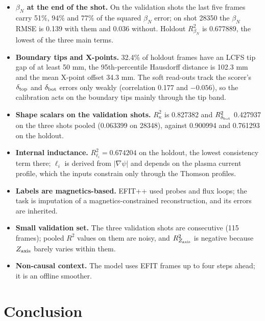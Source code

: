 \documentclass[11pt,a4paper]{article}
\numberwithin{equation}{section}
\begin{document}
\begin{itemize}
\item
  \textbf{\(\beta_N\) at the end of the shot.} On the validation shots the last five frames carry 51\%, 94\% and 77\% of the squared \(\beta_N\) error; on shot 28350 the \(\beta_N\) RMSE is 0.139 with them and 0.036 without. Holdout \(R^2_{\beta_N}\) is 0.677889, the lowest of the three main terms.
\item
  \textbf{Boundary tips and X-points.} 32.4\% of holdout frames have an LCFS tip gap of at least 50 mm, the 95th-percentile Hausdorff distance is 102.3 mm and the mean X-point offset 34.3 mm. The soft read-outs track the scorer's \(\delta_{\rm top}\) and \(\delta_{\rm bot}\) errors only weakly (correlation 0.177 and \(-0.056\)), so the calibration acts on the boundary tips mainly through the tip band.
\item
  \textbf{Shape scalars on the validation shots.} \(R^2_\kappa\) is 0.827382 and \(R^2_{\delta_{\rm bot}}\) 0.427937 on the three shots pooled (0.063399 on 28348), against 0.900994 and 0.761293 on the holdout.
\item
  \textbf{Internal inductance.} \(R^2_{\ell_i}=0.674204\) on the holdout, the lowest consistency term there; \(\ell_i\) is derived from \(|\nabla\psi|\) and depends on the plasma current profile, which the inputs constrain only through the Thomson profiles.
\item
  \textbf{Labels are magnetics-based.} EFIT++ used probes and flux loops; the task is imputation of a magnetics-constrained reconstruction, and its errors are inherited.
\item
  \textbf{Small validation set.} The three validation shots are consecutive (115 frames); pooled \(R^2\) values on them are noisy, and \(R^2_{Z_{\rm axis}}\) is negative because \(Z_{\rm axis}\) barely varies within them.
\item
  \textbf{Non-causal context.} The model uses EFIT frames up to four steps ahead; it is an offline smoother.
\end{itemize}

\hypertarget{conclusion}{%
\clearpage
\section{Conclusion}\label{conclusion}}
\end{document}
